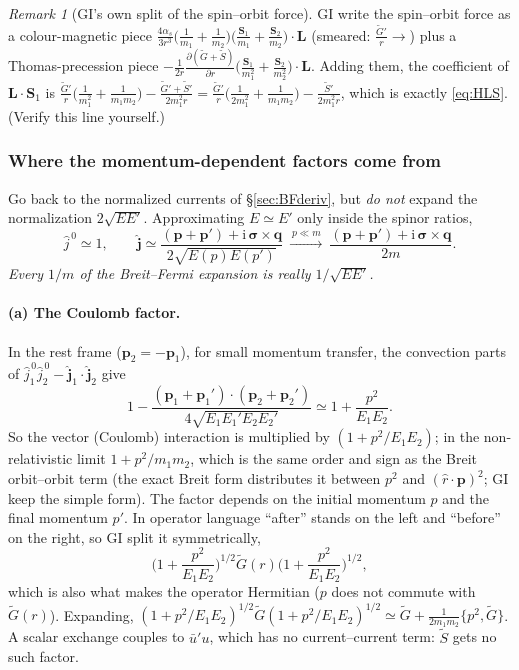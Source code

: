 \documentclass[11pt,a4paper]{article}
\numberwithin{equation}{section}
\theoremstyle{definition}
\theoremstyle{plain}
\theoremstyle{remark}
\newtheorem{remark}[definition]{Remark}
\numberwithin{algorithm}{section}
\newcommand{\vp}{\bm p}
\newcommand{\vq}{\bm q}
\newcommand{\vL}{\bm L}
\newcommand{\vS}{\bm S}
\newcommand{\vsig}{\bm\sigma}
\newcommand{\as}{\alpha_s}
\newcommand{\ii}{\mathrm{i}}
\begin{document}
\begin{remark}[GI's own split of the spin--orbit force]
GI write the spin--orbit force as a colour-magnetic piece $\frac{4\as}{3r^3}\big(\frac1{m_1}+\frac1{m_2}\big)\big(\frac{\vS_1}{m_1}+\frac{\vS_2}{m_2}\big)\!\cdot\!\vL$ (smeared: $\frac{\tilde G'}{r}\to$) plus a Thomas-precession piece $-\frac{1}{2r}\frac{\partial(\tilde G+\tilde S)}{\partial r}\big(\frac{\vS_1}{m_1^2}+\frac{\vS_2}{m_2^2}\big)\!\cdot\!\vL$. Adding them, the coefficient of $\vL\!\cdot\!\vS_1$ is $\frac{\tilde G'}{r}\big(\frac1{m_1^2}+\frac1{m_1m_2}\big)-\frac{\tilde G'+\tilde S'}{2m_1^2r}=\frac{\tilde G'}{r}\big(\frac1{2m_1^2}+\frac1{m_1m_2}\big)-\frac{\tilde S'}{2m_1^2r}$, which is exactly \eqref{eq:HLS}. (Verify this line yourself.)
\end{remark}

\subsubsection{Where the momentum-dependent factors come from}\label{sec:GIfactors}
Go back to the normalized currents of \S\ref{sec:BFderiv}, but \emph{do not} expand the normalization $2\sqrt{EE'}$. Approximating $E\simeq E'$ only inside the spinor ratios,
\begin{equation}
\hat j^{\,0}\simeq1,\qquad \hat{\bm j}\simeq\frac{(\vp+\vp')+\ii\,\vsig\times\vq}{2\sqrt{E(p)E(p')}}\ \xrightarrow{\,p\ll m\,}\ \frac{(\vp+\vp')+\ii\,\vsig\times\vq}{2m}.
\end{equation}
\emph{Every $1/m$ of the Breit--Fermi expansion is really $1/\sqrt{EE'}$.}

\paragraph{(a) The Coulomb factor.} In the rest frame ($\vp_2=-\vp_1$), for small momentum transfer, the convection parts of $\hat j_1^{\,0}\hat j_2^{\,0}-\hat{\bm j}_1\cdot\hat{\bm j}_2$ give
\begin{equation}
1-\frac{(\vp_1+\vp_1')\cdot(\vp_2+\vp_2')}{4\sqrt{E_1E_1'E_2E_2'}}\simeq1+\frac{p^2}{E_1E_2}.
\end{equation}
So the vector (Coulomb) interaction is multiplied by $(1+p^2/E_1E_2)$; in the non-relativistic limit $1+p^2/m_1m_2$, which is the same order and sign as the Breit orbit--orbit term (the exact Breit form distributes it between $p^2$ and $(\hat r\cdot\vp)^2$; GI keep the simple form). The factor depends on the initial momentum $p$ and the final momentum $p'$. In operator language ``after'' stands on the left and ``before'' on the right, so GI split it symmetrically,
\begin{equation}
\Big(1+\frac{p^2}{E_1E_2}\Big)^{1/2}\tilde G(r)\Big(1+\frac{p^2}{E_1E_2}\Big)^{1/2},
\end{equation}
which is also what makes the operator Hermitian ($p$ does not commute with $\tilde G(r)$). Expanding, $(1+p^2/E_1E_2)^{1/2}\tilde G(1+p^2/E_1E_2)^{1/2}\simeq\tilde G+\frac1{2m_1m_2}\{p^2,\tilde G\}$. A scalar exchange couples to $\bar u'u$, which has no current--current term: $\tilde S$ gets no such factor.
\end{document}
